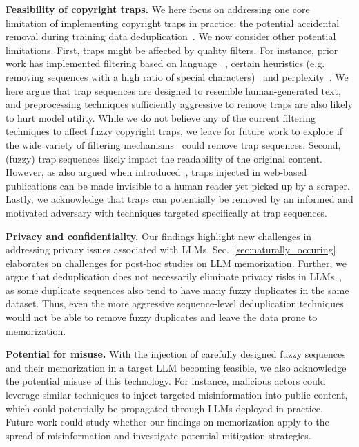 
\textbf{Feasibility of copyright traps.} We here focus on addressing one core limitation of implementing copyright traps in practice: the potential accidental removal during training data deduplication~\cite{lee2022deduplicating,kudugunta2024madlad,penedo2023refinedweb}. We now consider other potential limitations. First, traps might be affected by quality filters. For instance, prior work has implemented filtering based on language ~\cite{penedo2023refinedweb,soldaini2024dolma}, certain heuristics (e.g. removing sequences with a high ratio of special characters)~\cite{kudugunta2024madlad,rae2021scaling,laurenccon2022bigscience} and perplexity~\cite{wenzek2019ccnet}. We here argue that trap sequences are designed to resemble human-generated text, and preprocessing techniques sufficiently aggressive to remove traps are also likely to hurt model utility. While we do not believe any of the current filtering techniques to affect fuzzy copyright traps, we leave for future work to explore if the wide variety of filtering mechanisms~\cite{albalak2024survey} could remove trap sequences. Second, (fuzzy) trap sequences likely impact the readability of the original content. However, as also argued when introduced~\cite{meeus2024copyright,wei2024proving}, traps injected in web-based publications can be made invisible to a human reader yet picked up by a scraper. Lastly, we acknowledge that traps can potentially be removed by an informed and motivated adversary with techniques targeted specifically at trap sequences.

\textbf{Privacy and confidentiality.} Our findings highlight new challenges in addressing privacy issues associated with LLMs. Sec.~\ref{sec:naturally_occuring} elaborates on challenges for post-hoc studies on LLM memorization. Further, we argue that deduplication does not necessarily eliminate privacy risks in LLMs~\cite{kandpal2022deduplicating}, as some duplicate sequences also tend to have many fuzzy duplicates in the same dataset. Thus, even the more aggressive sequence-level deduplication techniques would not be able to remove fuzzy duplicates and leave the data prone to memorization. 

\textbf{Potential for misuse.} With the injection of carefully designed fuzzy sequences and their memorization in a target LLM becoming feasible, we also acknowledge the potential misuse of this technology. For instance, malicious actors could leverage similar techniques to inject targeted misinformation into public content, which could potentially be propagated through LLMs deployed in practice. Future work could study whether our findings on memorization apply to the spread of misinformation and investigate potential mitigation strategies.  

